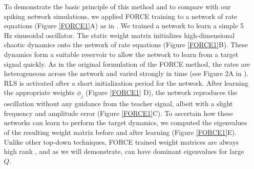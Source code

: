 \documentclass[11pt]{article} %
\begin{document}
To demonstrate the basic principle of this method and to compare with our spiking network simulations, we applied FORCE training to a network of rate equations (Figure \ref{FORCE1}A) as in \cite{FORCE1}.  We trained a network to learn a simple 5 Hz sinusoidal oscillator.  The static weight matrix initializes high-dimensional chaotic dynamics onto the network of rate equations (Figure \ref{FORCE1}B).  These dynamics form a suitable reservoir to allow the network to learn from a target signal quickly.   As in the original formulation of the FORCE method, the rates are heterogeneous across the network and varied strongly in time (see Figure 2A in \cite{FORCE1}). RLS is activated after a short initialization period for the network.  After learning the appropriate weights $\phi_j $ (Figure \ref{FORCE1} D), the network reproduces the oscillation without any guidance from the teacher signal, albeit with a slight frequency and amplitude error (Figure \ref{FORCE1}C).   To ascertain how these networks can learn to perform the target dynamics, we computed the eigenvalues of the resulting weight matrix before and after learning (Figure \ref{FORCE1}E).  Unlike other top-down techniques, FORCE trained weight matrices are always high rank \cite{AbbottR}, and as we will demonstrate, can have dominant eigenvalues for large $Q$.






\end{document}
